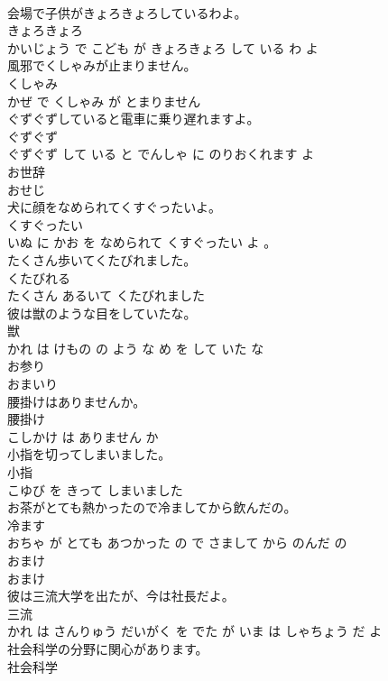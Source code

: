 \documentclass[8pt]{extreport}
\begin{document}
\begin{CJK}{UTF8}{min}
\\	会場で子供がきょろきょろしているわよ。	
\\	きょろきょろ 
\\	かいじょう で こども が きょろきょろ して いる わ よ			
\\	風邪でくしゃみが止まりません。	
\\	くしゃみ 
\\	かぜ で くしゃみ が とまりません			
\\	ぐずぐずしていると電車に乗り遅れますよ。	
\\	ぐずぐず 
\\	ぐずぐず して いる と でんしゃ に のりおくれます よ			
\\	お世辞	
\\	おせじ		
\\	犬に顔をなめられてくすぐったいよ。	
\\	くすぐったい 
\\	いぬ に かお を なめられて くすぐったい よ 。			
\\	たくさん歩いてくたびれました。	
\\	くたびれる 
\\	たくさん あるいて くたびれました			
\\	彼は獣のような目をしていたな。	
\\	獣 
\\	かれ は けもの の よう な め を して いた な			
\\	お参り	
\\	おまいり		
\\	腰掛けはありませんか。	
\\	腰掛け 
\\	こしかけ は ありません か			
\\	小指を切ってしまいました。	
\\	小指 
\\	こゆび を きって しまいました			
\\	お茶がとても熱かったので冷ましてから飲んだの。	
\\	冷ます 
\\	おちゃ が とても あつかった の で さまして から のんだ の			
\\	おまけ	
\\	おまけ		
\\	彼は三流大学を出たが、今は社長だよ。	
\\	三流 
\\	かれ は さんりゅう だいがく を でた が いま は しゃちょう だ よ			
\\	社会科学の分野に関心があります。	
\\	社会科学 

\end{CJK}
\end{document}
